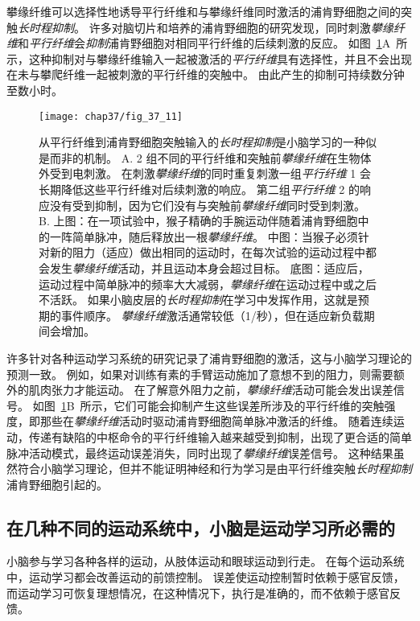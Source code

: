 攀缘纤维可以选择性地诱导平行纤维和与攀缘纤维同时激活的浦肯野细胞之间的突触\textit{长时程抑制}。
许多对脑切片和培养的浦肯野细胞的研究发现，同时刺激\textit{攀缘纤维}和\textit{平行纤维}会\textit{抑制}浦肯野细胞对相同平行纤维的后续刺激的反应。
如图~\ref{fig:37_11}A~所示，这种抑制对与攀缘纤维输入一起被激活的\textit{平行纤维}具有选择性，并且不会出现在未与攀爬纤维一起被刺激的平行纤维的突触中。
由此产生的抑制可持续数分钟至数小时。


\begin{figure}[htbp]
	\centering
	\texttt{[image: chap37/fig\_37\_11]}
	\caption{从平行纤维到浦肯野细胞突触输入的\textit{长时程抑制}是小脑学习的一种似是而非的机制。
		A. 2 组不同的平行纤维和突触前\textit{攀缘纤维}在生物体外受到电刺激。
		在刺激\textit{攀缘纤维}的同时重复刺激一组\textit{平行纤维} 1 会长期降低这些平行纤维对后续刺激的响应。
		第二组\textit{平行纤维} 2 的响应没有受到抑制，因为它们没有与突触前\textit{攀缘纤维}同时受到刺激\cite{ito1982climbing}。
		B. 上图：在一项试验中，猴子精确的手腕运动伴随着浦肯野细胞中的一阵简单脉冲，随后释放出一根\textit{攀缘纤维}。
		中图：当猴子必须针对新的阻力（适应）做出相同的运动时，在每次试验的运动过程中都会发生\textit{攀缘纤维}活动，并且运动本身会超过目标。
		底图：适应后，运动过程中简单脉冲的频率大大减弱，\textit{攀缘纤维}在运动过程中或之后不活跃。
		如果小脑皮层的\textit{长时程抑制}在学习中发挥作用，这就是预期的事件顺序。
		\textit{攀缘纤维}激活通常较低（1/秒），但在适应新负载期间会增加\cite{gilbert1977purkinje}。}
	\label{fig:37_11}
\end{figure}


许多针对各种运动学习系统的研究记录了浦肯野细胞的激活，这与小脑学习理论的预测一致。
例如，如果对训练有素的手臂运动施加了意想不到的阻力，则需要额外的肌肉张力才能运动。
在了解意外阻力之前，\textit{攀缘纤维}活动可能会发出误差信号。
如图~\ref{fig:37_11}B~所示，它们可能会抑制产生这些误差所涉及的平行纤维的突触强度，即那些在\textit{攀缘纤维}活动时驱动浦肯野细胞简单脉冲激活的纤维。
随着连续运动，传递有缺陷的中枢命令的平行纤维输入越来越受到抑制，出现了更合适的简单脉冲活动模式，最终运动误差消失，同时出现了\textit{攀缘纤维}误差信号。
这种结果虽然符合小脑学习理论，但并不能证明神经和行为学习是由平行纤维突触\textit{长时程抑制}浦肯野细胞引起的。



\subsection{在几种不同的运动系统中，小脑是运动学习所必需的}

小脑参与学习各种各样的运动，从肢体运动和眼球运动到行走。
在每个运动系统中，运动学习都会改善运动的前馈控制。
误差使运动控制暂时依赖于感官反馈，而运动学习可恢复理想情况，在这种情况下，执行是准确的，而不依赖于感官反馈。


